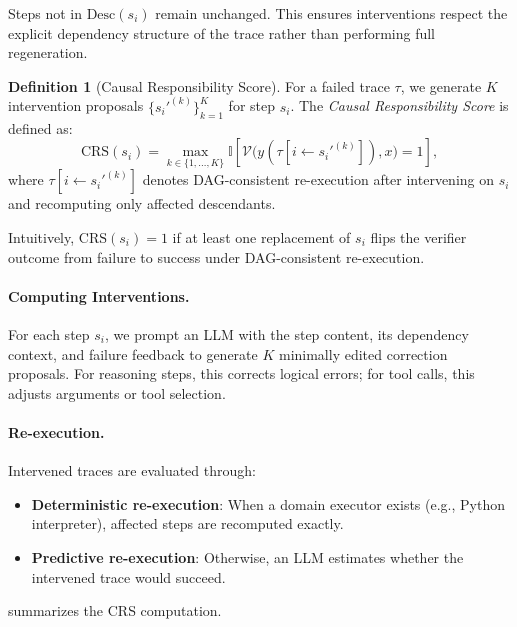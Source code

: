 \documentclass{article}
\theoremstyle{plain}
\theoremstyle{definition}
\newtheorem{definition}[theorem]{Definition}
\theoremstyle{remark}
\begin{document}
Steps not in $\mathrm{Desc}(s_i)$ remain unchanged. This ensures interventions respect the explicit dependency structure of the trace rather than performing full regeneration.

\begin{definition}[Causal Responsibility Score]
For a failed trace $\tau$, we generate $K$ intervention proposals $\{s_i'^{(k)}\}_{k=1}^K$ for step $s_i$. The \emph{Causal Responsibility Score} is defined as:
\begin{equation}
\mathrm{CRS}(s_i)
=
\max_{k \in \{1,\dots,K\}}
\mathbb{I}\!\left[
\mathcal{V}\!\big(y(\tau[i \leftarrow s_i'^{(k)}]), x\big)=1
\right],
\end{equation}
where $\tau[i \leftarrow s_i'^{(k)}]$ denotes DAG-consistent re-execution after intervening on $s_i$ and recomputing only affected descendants.
\end{definition}

Intuitively, $\mathrm{CRS}(s_i)=1$ if at least one replacement of $s_i$ flips the verifier outcome from failure to success under DAG-consistent re-execution.


\paragraph{Computing Interventions.}
For each step $s_i$, we prompt an LLM with the step content, its dependency context, and failure feedback to generate $K$ minimally edited correction proposals. For reasoning steps, this corrects logical errors; for tool calls, this adjusts arguments or tool selection.

\paragraph{Re-execution.}
Intervened traces are evaluated through:

\begin{itemize}
    \item \textbf{Deterministic re-execution}: When a domain executor exists (e.g., Python interpreter), affected steps are recomputed exactly.
    \item \textbf{Predictive re-execution}: Otherwise, an LLM estimates whether the intervened trace would succeed.
\end{itemize}

 summarizes the CRS computation.
\end{document}

